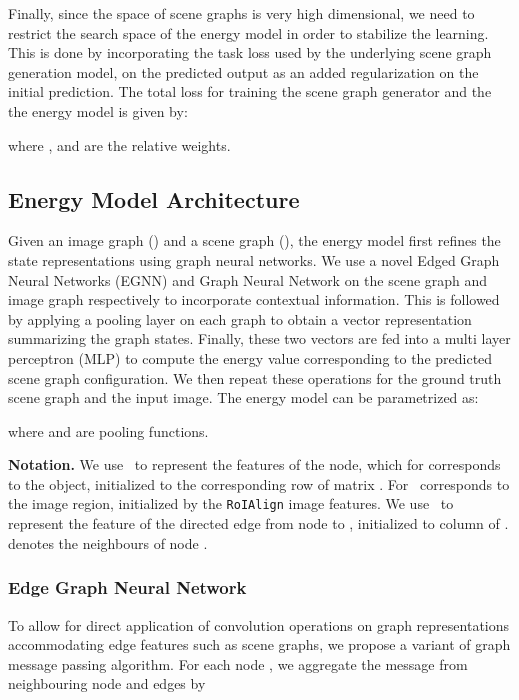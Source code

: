 \documentclass[final]{cvpr}
\newcommand{\noderep}{}
\newcommand{\edgerep}{}
\newcommand{\imagegraph}{}
\newcommand{\scenegraph}{}
\begin{document}
Finally, since the space of scene graphs is very high dimensional, we need to restrict the search space of the energy model in order to stabilize the learning. This is done by incorporating the task loss used by the underlying scene graph generation model,  on the predicted output as an added regularization on the initial prediction. The total loss for training the scene graph generator and the the energy model is given by:

where ,  and  are the relative weights.  

\subsection{Energy Model Architecture}
\label{sec:energy_model_architecture}
Given an image graph (\imagegraph) and a scene graph (\scenegraph), the energy
model first refines the state representations using graph neural networks. We use a novel Edged Graph Neural Networks (EGNN) and Graph Neural Network \cite{DBLP:journals/corr/LiTBZ15} on the scene graph and image graph respectively to incorporate contextual information. This is followed by applying a pooling layer on each graph to obtain a vector representation summarizing the graph states. Finally, these two vectors are fed into a multi layer perceptron (MLP) to compute the energy value corresponding to the predicted scene graph configuration. We then repeat these operations for the ground truth scene graph and the input image. The energy model can be parametrized as:
\vspace{-0.05in}

where  and  are pooling functions.

\vspace{0.08in}
\noindent
\textbf{Notation.} 
We use \noderep~to represent the features of the  node, which for  corresponds to the  object, initialized to the  corresponding  row of matrix . For   \noderep~corresponds to the  image region, initialized by the {\tt RoIAlign} image features. 
We use \edgerep~to represent the feature of the directed edge from node  to , initialized to  column of .  denotes the neighbours of node . 
\subsubsection{Edge Graph Neural Network}
To allow for direct application of convolution operations on graph representations accommodating edge features such as scene graphs, we propose a variant of graph message passing algorithm. For each node \noderep, we aggregate the message from neighbouring node and edges by
\end{document}
